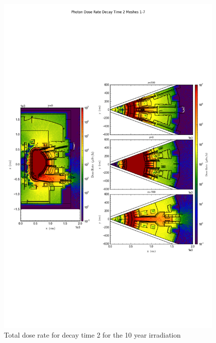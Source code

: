 \documentclass[12pt]{article}
\begin{document}
\begin{figure}[ht!]
\centering
\includegraphics[trim={0cm 8cm, 0cm 8cm},clip,scale=0.75]{../plots/final_model_with_b4c/10year/Photon_Dose_Rate_Decay_Time_2_Meshes_1-7.png}
\caption{Total dose rate for decay time 2 for the 10 year irradiation}
\label{fig:photons_10y_dc2_b4c_dose}
\end{figure}
\end{document}
